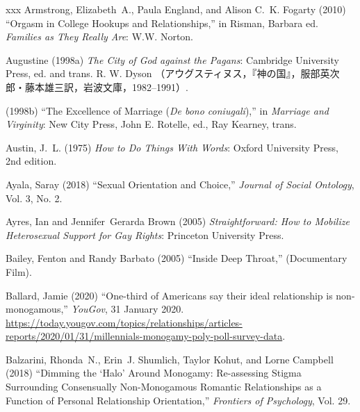 \documentclass[]{jlreq} \usepackage{mystyle}
\begin{document}
\begin{thebibliography}{xxx}
Armstrong, Elizabeth~A., Paula England, and Alison C.~K. Fogarty (2010)
  ``Orgasm in College Hookups and Relationships,'' in Risman, Barbara ed.
  \textit{ Families as They Really Are}: W.W. Norton.

Augustine (1998a)  \textit{ The City of God against the Pagans}: Cambridge
  University Press, ed. and trans. R. W. Dyson
  （アウグスティヌス，『神の国』，服部英次郎・藤本雄三訳，岩波文庫，1982--1991）.

 \bysame{}  (1998b) ``The Excellence of Marriage (\emph{De bono coniugali}),''
  in  \textit{ Marriage and Virginity}: New City Press, John E. Rotelle, ed.,
  Ray Kearney, trans.

Austin, J.~L. (1975)  \textit{ How to Do Things With Words}: Oxford University
  Press, 2nd edition.

Ayala, Saray (2018) ``Sexual Orientation and Choice,'' \textit{ Journal of
  Social Ontology}, Vol. 3, No. 2.

Ayres, Ian and Jennifer~Gerarda Brown (2005)  \textit{ Straightforward: How to
  Mobilize Heterosexual Support for Gay Rights}: Princeton University Press.

Bailey, Fenton and Randy Barbato (2005) ``Inside Deep Throat,'' (Documentary
  Film).

Ballard, Jamie (2020) ``One-third of Americans say their ideal relationship is
  non-monogamous,'' \emph{YouGov}, 31 January 2020.
  \url{https://today.yougov.com/topics/relationships/articles-reports/2020/01/31/millennials-monogamy-poly-poll-survey-data}.

Balzarini, Rhonda~N., Erin~J. Shumlich, Taylor Kohut, and Lorne Campbell (2018)
  ``Dimming the `Halo' Around Monogamy: Re-assessing Stigma Surrounding
  Consensually Non-Monogamous Romantic Relationships as a Function of Personal
  Relationship Orientation,'' \textit{ Frontiers of Psychology}, Vol. 29.


\end{thebibliography}
\end{document}
